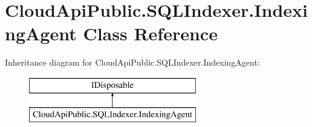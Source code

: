 \hypertarget{class_cloud_api_public_1_1_s_q_l_indexer_1_1_indexing_agent}{\section{Cloud\-Api\-Public.\-S\-Q\-L\-Indexer.\-Indexing\-Agent Class Reference}
\label{class_cloud_api_public_1_1_s_q_l_indexer_1_1_indexing_agent}
}
Inheritance diagram for Cloud\-Api\-Public.\-S\-Q\-L\-Indexer.\-Indexing\-Agent\-:\begin{figure}[H]
\begin{center}
\leavevmode
\includegraphics[height=2.000000cm]{class_cloud_api_public_1_1_s_q_l_indexer_1_1_indexing_agent}
\end{center}
\end{figure}
